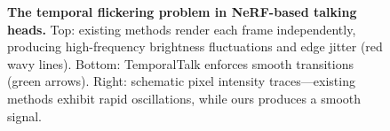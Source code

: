 \documentclass[10pt,twocolumn,letterpaper]{article}
\begin{document}
\begin{figure}[t]
{
}
\caption{\textbf{The temporal flickering problem in NeRF-based talking heads.} Top: existing methods render each frame independently, producing high-frequency brightness fluctuations and edge jitter (red wavy lines). Bottom: TemporalTalk enforces smooth transitions (green arrows). Right: schematic pixel intensity traces---existing methods exhibit rapid oscillations, while ours produces a smooth signal.}
\label{fig:flickering_problem}
\end{figure}
\end{document}
